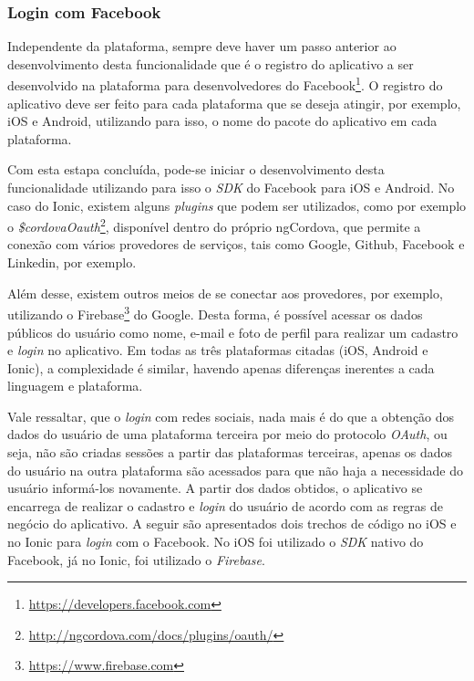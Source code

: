 \subsubsection{Login com Facebook} \label{subsubsec:loginfb}
Independente da plataforma, sempre deve haver um passo anterior ao desenvolvimento desta funcionalidade que é o registro do 
aplicativo a ser desenvolvido na plataforma para desenvolvedores do Facebook\footnote{\url{https://developers.facebook.com}}. O registro do aplicativo deve ser feito
para cada plataforma que se deseja atingir, por exemplo, iOS e Android, utilizando para isso, o nome do pacote do aplicativo em cada plataforma.

Com esta estapa concluída, pode-se iniciar o desenvolvimento desta funcionalidade utilizando para isso o \textit{SDK} do Facebook para iOS e Android.
No caso do Ionic, existem alguns \textit{plugins} que podem ser utilizados, como por exemplo o \textit{\$cordovaOauth}\footnote{\url{http://ngcordova.com/docs/plugins/oauth/}}, disponível dentro do próprio ngCordova, 
que permite a conexão com vários provedores de serviços, tais como Google, Github, Facebook e Linkedin, por exemplo. 

Além desse, existem outros meios de se conectar aos provedores, por exemplo, utilizando o 
Firebase\footnote{\url{https://www.firebase.com}} do Google. Desta forma, é possível acessar os dados públicos do usuário como nome, e-mail e foto de perfil para realizar um cadastro e \textit{login} no aplicativo.
Em todas as três plataformas citadas (iOS, Android e Ionic), a complexidade é similar, havendo apenas diferenças inerentes a cada linguagem e plataforma. 

Vale ressaltar, que o \textit{login} com redes sociais, nada mais é do que a obtenção dos dados do usuário de uma plataforma terceira por meio do protocolo \textit{OAuth}, 
ou seja, não são criadas sessões a partir das plataformas terceiras, apenas os dados do usuário na outra plataforma são acessados para que não haja a necessidade do usuário informá-los novamente. A partir dos dados 
obtidos, o aplicativo se encarrega de realizar o cadastro e \textit{login} do usuário de acordo com as regras de negócio do aplicativo. 
A seguir são apresentados dois trechos de código no iOS e no Ionic para \textit{login} com o Facebook. No iOS foi utilizado o \textit{SDK} nativo do Facebook, já no Ionic, foi utilizado o \textit{Firebase}. 

